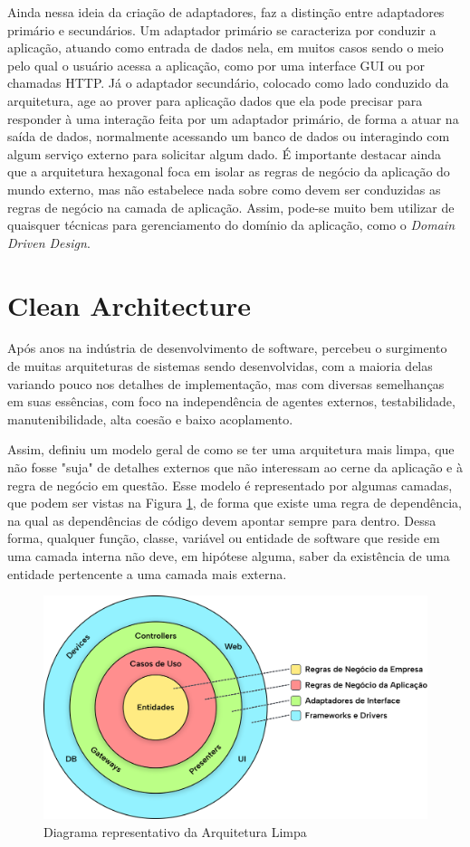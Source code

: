 \documentclass[12pt, %
openright, 
oneside, %
a4paper,    %
brazil]{facom-ufu-abntex2}
\begin{document}
Ainda nessa ideia da criação de adaptadores,  faz a distinção entre adaptadores primário e secundários. Um adaptador primário se caracteriza por conduzir a aplicação, atuando como entrada de dados nela, em muitos casos sendo o meio pelo qual o usuário acessa a aplicação, como por uma interface GUI ou por chamadas HTTP. Já o adaptador secundário, colocado como lado conduzido da arquitetura, age ao prover para aplicação dados que ela pode precisar para responder à uma interação feita por um adaptador primário, de forma a atuar na saída de dados, normalmente acessando um banco de dados ou interagindo com algum serviço externo para solicitar algum dado. É importante destacar ainda que a arquitetura hexagonal foca em isolar as regras de negócio da aplicação do mundo externo, mas não estabelece nada sobre como devem ser conduzidas as regras de negócio na camada de aplicação. Assim, pode-se muito bem utilizar de quaisquer técnicas para gerenciamento do domínio da aplicação, como o \textit{Domain Driven Design}.

\section{Clean Architecture}
Após anos na indústria de desenvolvimento de software,  percebeu o surgimento de muitas arquiteturas de sistemas sendo desenvolvidas, com a maioria delas variando pouco nos detalhes de implementação, mas com diversas semelhanças em suas essências, com foco na independência de agentes externos, testabilidade, manutenibilidade, alta coesão e baixo acoplamento.

Assim,  definiu um modelo geral de como se ter uma arquitetura mais limpa, que não fosse "suja" de detalhes externos que não interessam ao cerne da aplicação e à regra de negócio em questão. Esse modelo é representado por algumas camadas, que podem ser vistas na Figura \ref{fig:clean_arch_diagram}, de forma que existe uma regra de dependência, na qual as dependências de código devem apontar sempre para dentro. Dessa forma, qualquer função, classe, variável ou entidade de software que reside em uma camada interna não deve, em hipótese alguma, saber da existência de uma entidade pertencente a uma camada mais externa.

\begin{figure}[ht]
    \centering
    \includegraphics[width=.6\textwidth]{figures/bibliographical_review/clean_arch_diagram.png}
    \caption{Diagrama representativo da Arquitetura Limpa}
    \label{fig:clean_arch_diagram}
\end{figure}
\end{document}
